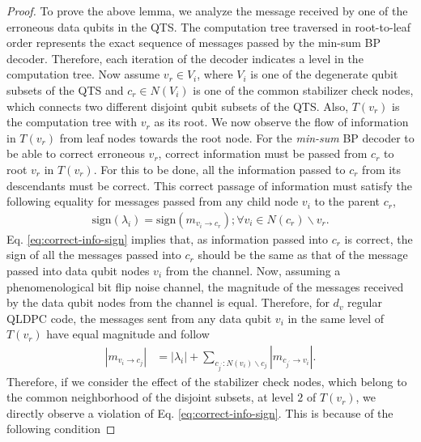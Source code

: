 \documentclass[%
 reprint,
 amsmath,amssymb,
 aps,
pra,
showkeys,
]{revtex4-2}
\begin{document}
\begin{proof}
    To prove the above lemma, we analyze the message received by one of the erroneous data qubits in the QTS.
    The computation tree traversed in root-to-leaf order represents the exact sequence of messages passed by the min-sum BP decoder.
    Therefore, each iteration of the decoder indicates a level in the computation tree.
    Now assume $v_r \in V_i$, where $V_i$ is one of the degenerate qubit subsets of the QTS and $c_r \in N(V_i)$ is one of the common stabilizer check nodes, which connects two different disjoint qubit subsets of the QTS.
    Also, $T(v_r)$ is the computation tree with $v_r$ as its root.
    We now observe the flow of information in $T(v_r)$ from leaf nodes towards the root node.
    For the \textit{min-sum} BP decoder to be able to correct erroneous $v_r$, correct information must be passed from $c_r$ to root $v_r$ in $T(v_r)$.
    For this to be done, all the information passed to $c_r$ from its descendants must be correct.
    This correct passage of information must satisfy the following equality for messages passed from any child node $v_i$ to the parent $c_r$,
    \begin{align}
        \mathrm{sign}(\lambda_i) = \mathrm{sign}(m_{v_i \rightarrow c_r}); \forall v_i \in N(c_r)\backslash v_r.
        \label{eq:correct-info-sign}
    \end{align}
    Eq. \eqref{eq:correct-info-sign} implies that, as information passed into $c_r$ is correct, the sign of all the messages passed into $c_r$ should be the same as that of the message passed into data qubit nodes $v_i$ from the channel.
    Now, assuming a phenomenological bit flip noise channel, the magnitude of the messages received by the data qubit nodes from the channel is equal.
    Therefore, for $d_v$ regular QLDPC code, the messages sent from any data qubit $v_i$ in the same level of $T(v_r)$ have equal magnitude and follow
    \begin{align}
        |m_{v_i \rightarrow c_j}| &= |\lambda_i| + \sum_{c_{j^\prime}:N(v_i)\backslash c_j}|m_{c_{j^{\prime}}\rightarrow v_i}|.
    \end{align}
    Therefore, if we consider the effect of the stabilizer check nodes, which belong to the common neighborhood of the disjoint subsets, at level $2$ of $T(v_r)$, we directly observe a violation of Eq. \eqref{eq:correct-info-sign}.
    This is because of the following condition

\end{proof}
\end{document}
